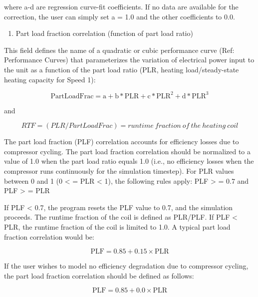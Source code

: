 where a-d are regression curve-fit coefficients.  If no data are available for the correction, the user can simply set a = 1.0 and the other coefficients to 0.0.

\begin{enumerate}
\def\labelenumi{\arabic{enumi})}
\setcounter{enumi}{4}
\tightlist
\item
  Part load fraction correlation (function of part load ratio)
\end{enumerate}

This field defines the name of a quadratic or cubic performance curve (Ref: Performance Curves) that parameterizes the variation of electrical power input to the unit as a function of the part load ratio (PLR, heating load/steady-state heating capacity for Speed 1):

\begin{equation}
{\mathrm{PartLoadFrac}} = {\mathrm{a}} + {\mathrm{b*PLR}} + {\mathrm{c*PL}}{{\mathrm{R}}^2} + {\mathrm{d*PL}}{{\mathrm{R}}^3}
\end{equation}

and

\begin{equation}
RTF = (PLR/PartLoadFrac) = runtime~fraction~of~the~heating~coil
\end{equation}

The part load fraction (PLF) correlation accounts for efficiency losses due to compressor cycling. The part load fraction correlation should be normalized to a value of 1.0 when the part load ratio equals 1.0 (i.e., no efficiency losses when the compressor runs continuously for the simulation timestep). For PLR values between 0 and 1 (0 \textless{} = PLR \textless{} 1), the following rules apply:  PLF \textgreater{} = 0.7 and PLF \textgreater{} = PLR

If PLF \textless{} 0.7, the program resets the PLF value to 0.7, and the simulation proceeds. The runtime fraction of the coil is defined as PLR/PLF. If PLF \textless{} PLR, the runtime fraction of the coil is limited to 1.0. A typical part load fraction correlation would be:

\begin{equation}
{\mathrm{PLF}} = 0.85 + 0.15 \times {\mathrm{PLR}}
\end{equation}

If the user wishes to model no efficiency degradation due to compressor cycling, the part load fraction correlation should be defined as follows:

\begin{equation}
{\mathrm{PLF}} = 0.85 + 0.0 \times {\mathrm{PLR}}
\end{equation}


